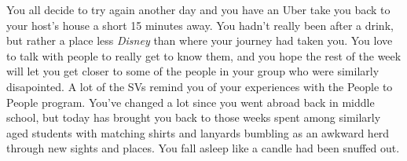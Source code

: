 \documentclass[../main.tex]{subfiles}
\begin{document}
You all decide to try again another day and you have an Uber take you back to your host's house a short 15 minutes away. You hadn't really been after a drink, but rather a place less \textit{Disney} than where your journey had taken you. You love to talk with people to really get to know them, and you hope the rest of the week will let you get closer to some of the people in your group who were similarly disapointed. A lot of the SVs remind you of your experiences with the People to People program. You've changed a lot since you went abroad back in middle school, but today has brought you back to those weeks spent among similarly aged students with matching shirts and lanyards bumbling as an awkward herd through new sights and places. You fall asleep like a candle had been snuffed out.
\end{document}

